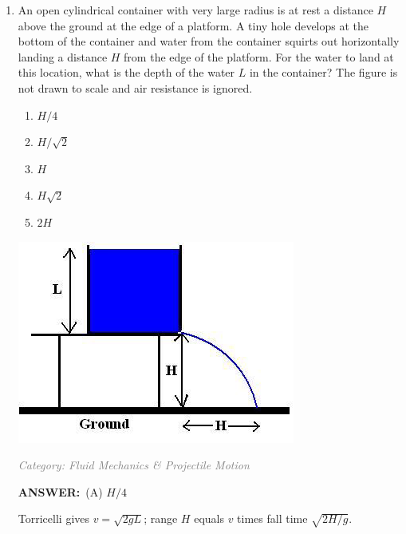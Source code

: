 ﻿\documentclass[12pt, a4paper]{article}
\makeatletter
\newcommand{\finalanswer}[1]{\textbf{ANSWER:}~#1}
\newif\if@categoryprinted
\newcommand{\category}[1]{\if@categoryprinted\relax\else\textit{\textcolor{gray}{Category: #1}}\global\@categoryprintedtrue\fi}
\newcommand{\tags}[1]{}
\makeatother
\begin{document}
\begin{CJK*}{UTF8}{gbsn}
\begin{enumerate}[itemsep=1.0em, topsep=0.6em]
\item \label{prob:18}
\noindent\begin{minipage}[t]{0.6\linewidth}
\vspace{0pt}
An open cylindrical container with very large radius is at rest a distance $H$ above the ground at the edge of a platform. A tiny hole develops at the bottom of the container and water from the container squirts out horizontally landing a distance $H$ from the edge of the platform. For the water to land at this location, what is the depth of the water $L$ in the container? The figure is not drawn to scale and air resistance is ignored.
\begin{enumerate}[label=(\Alph*)]
    \item $H/4$
    \item $H/\sqrt{2}$
    \item $H$
    \item $H\sqrt{2}$
    \item $2H$
\end{enumerate}
\end{minipage}%
\hfill
\begin{minipage}[t]{0.32\linewidth}
\vspace{0pt}
\centering
\includegraphics[width=\linewidth]{Problem_18_Figure.png}
\end{minipage}

\category{Fluid Mechanics \& Projectile Motion} \tags{}
\begin{answerbox}
\finalanswer{(A) $H/4$}
\end{answerbox}
\begin{insightbox}
Torricelli gives $v=\sqrt{2gL}$; range $H$ equals $v$ times fall time $\sqrt{2H/g}$.
\end{insightbox}
\begin{solutionbox}


\end{solutionbox}
\end{enumerate}
\end{CJK*}
\end{document}
